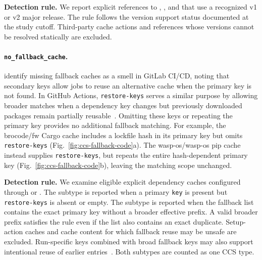 \documentclass[smallextended]{svjour3}
\begin{document}


\textbf{Detection rule.}
We report explicit references to , , and  that use a recognized v1 or v2 major release. The rule follows the version support status documented at the study cutoff. Third-party cache actions and references whose versions cannot be resolved statically are excluded.



\FloatBarrier
\paragraph{\texttt{no\_fallback\_cache}.}
\citet{urdih2026cache} identify missing fallback caches as a smell in GitLab CI/CD, noting that secondary keys allow jobs to reuse an alternative cache when the primary key is not found. In GitHub Actions, \texttt{restore-keys} serves a similar purpose by allowing broader matches when a dependency key changes but previously downloaded packages remain partially reusable~\citep{gha_cache_docs,gha_cache_strategies}. Omitting these keys or repeating the primary key provides no additional fallback matching. For example, the brocode/fw Cargo cache includes a lockfile hash in its primary key but omits \texttt{restore-keys} (Fig.~\ref{fig:ccs-fallback-code}a). The wasp-os/wasp-os pip cache instead supplies \texttt{restore-keys}, but repeats the entire hash-dependent primary key (Fig.~\ref{fig:ccs-fallback-code}b), leaving the matching scope unchanged.



\textbf{Detection rule.}
We examine eligible explicit dependency caches configured through  or . The  subtype is reported when a primary \texttt{key} is present but \texttt{restore-keys} is absent or empty. The  subtype is reported when the fallback list contains the exact primary key without a broader effective prefix. A valid broader prefix satisfies the rule even if the list also contains an exact duplicate. Setup-action caches and cache content for which fallback reuse may be unsafe are excluded. Run-specific keys combined with broad fallback keys may also support intentional reuse of earlier entries~\citep{gha_cache_tips}. Both subtypes are counted as one CCS type.
\end{document}
